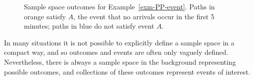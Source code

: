 \documentclass[
  letterpaper,
  DIV=11,
  numbers=noendperiod]{scrreprt}
\theoremstyle{plain}
\theoremstyle{definition}
\theoremstyle{definition}
\theoremstyle{definition}
\theoremstyle{remark}
\begin{document}
\begin{figure}


\caption{\label{fig-PP-event}Sample space outcomes for
Example~\ref{exm-PP-event}. Paths in orange satisfy \(A\), the event
that no arrivals occur in the first 5 minutes; paths in blue do not
satisfy event \(A\).}

\end{figure}%

In many situations it is not possible to explicitly define a sample
space in a compact way, and so outcomes and events are often only
vaguely defined. Nevertheless, there is always a sample space in the
background representing possible outcomes, and collections of these
outcomes represent events of interest.
\end{document}
